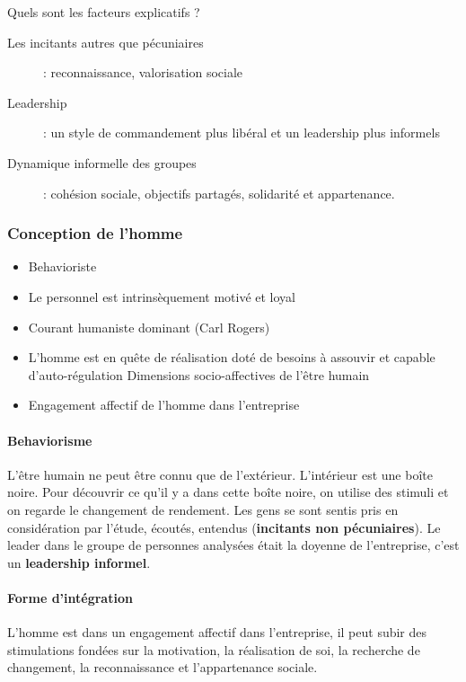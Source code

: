 \documentclass[12pt]{article}
\begin{document}
	  Quels sont les facteurs explicatifs ?
	  
	  \begin{description}
	   \item[Les incitants autres que pécuniaires] : reconnaissance, valorisation sociale
	   \item[Leadership] : un style de commandement plus libéral et un leadership plus informels
	   \item[Dynamique informelle des groupes] : cohésion sociale, objectifs partagés, solidarité et appartenance.
	  \end{description}
	  
	  \subsubsection{Conception de l'homme}
	  
	  \begin{itemize}
	   \item Behavioriste
	   \item Le personnel est intrinsèquement motivé et loyal
	   \item Courant humaniste dominant (Carl Rogers)
	   \item L'homme est en quête de réalisation
	    \subitem doté de besoins à assouvir et capable d'auto-régulation
	    \subitem Dimensions socio-affectives de l'être humain
	   \item Engagement affectif de l'homme dans l'entreprise
	  \end{itemize}

	  
	  \paragraph{Behaviorisme} L'être humain ne peut être connu que de l'extérieur. L'intérieur est une \og{} boîte noire\fg{}. Pour découvrir ce qu'il y a dans cette boîte noire, on utilise des stimuli et on regarde le changement de rendement. Les gens se sont sentis pris en considération par l'étude, écoutés, entendus (\textbf{incitants non pécuniaires}). Le leader dans le groupe de personnes analysées était la doyenne de l'entreprise, c'est un \textbf{leadership informel}.
	  
	  \paragraph{Forme d'intégration} L'homme est dans un engagement affectif dans l'entreprise, il peut subir des stimulations fondées sur la motivation, la réalisation de soi, la recherche de changement, la reconnaissance et l'appartenance sociale.
	  
\end{document}
